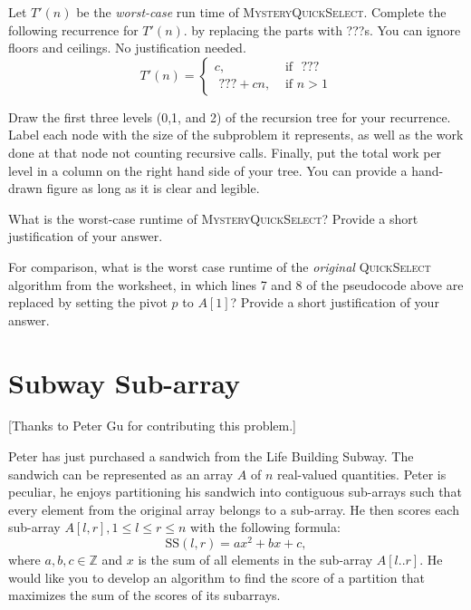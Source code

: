 \documentclass[11pt,fleqn]{exam}
\newcommand{\subsum}{\mbox{SS}}
\begin{document}
\begin{questions}
\question[3]
Let $T'(n)$ be the {\em worst-case} run time of \textsc{MysteryQuickSelect}. Complete the following
recurrence for $T'(n)$. by replacing the parts with ???s. You can ignore floors and ceilings.  No justification needed.
 \[
   T'(n) = \left\{ \begin{array}{ll}
               c, & \mbox{ if }  \mbox{ ???} \\
            \mbox{ ???} + cn , & \mbox{ if } n > 1
             \end{array} \right.
   \]


\question[3]
Draw the first three levels (0,1, and 2) of the recursion tree for your recurrence. Label each node with the size of the subproblem it represents, as well as the work done at that node not counting recursive calls. Finally, put the total work per level in a column on the right hand side of your tree. You can provide a hand-drawn figure as long as it is clear and legible. 

\question[2]
What is the worst-case runtime of \textsc{MysteryQuickSelect}? Provide a short justification of your answer.

\question[2]
For comparison, what is the worst case runtime of the {\em original}  \textsc{QuickSelect} algorithm from the worksheet, in which lines 7 and 8 of the pseudocode above are replaced by setting the pivot $p$ to $A[1]$?  Provide a short justification of your answer.

\end{questions}

\newpage
	        
\section{Subway Sub-array}

[Thanks to Peter Gu for contributing this problem.]

\vspace{.1in}

\noindent
Peter has just purchased a sandwich from the Life Building Subway. The sandwich can be represented as an array $A$ of $n$ real-valued quantities. Peter is peculiar, he enjoys partitioning his sandwich into contiguous sub-arrays such that every element from the original array belongs to a sub-array. He then scores each sub-array $A[l,r], 1 \le l \le r \le n$ with the following formula:
\[
    \subsum(l,r) = ax^2 + bx + c,
\]
where $a, b, c \in \mathbb{Z}$ and $x$ is the sum of all elements in the sub-array $A[l..r]$. He would like you to develop an algorithm to find the score of a partition that maximizes the sum of the scores of its subarrays.
\end{document}
